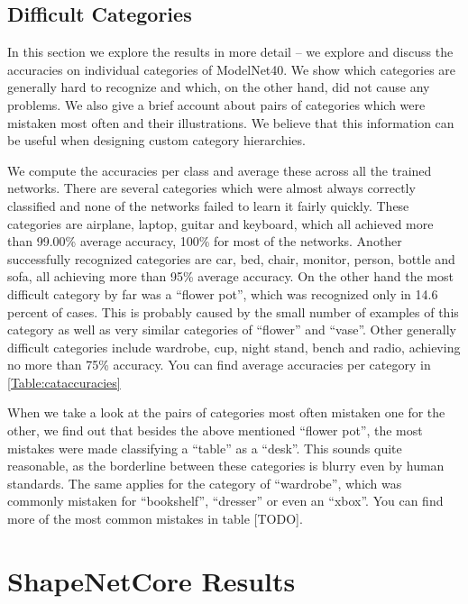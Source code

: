 \subsection{Difficult Categories}
In this section we explore the results in more detail -- we explore and discuss the accuracies on individual categories of ModelNet40. We show which categories are generally hard to recognize and which, on the other hand, did not cause any problems. We also give a brief account about pairs of categories which were mistaken most often and their illustrations. We believe that this information can be useful when designing custom category hierarchies. \par
We compute the accuracies per class and average these across all the trained networks. There are several categories which were almost always correctly classified and none of the networks failed to learn it fairly quickly. These categories are airplane, laptop, guitar and keyboard, which all achieved more than 99.00\% average accuracy, 100\% for most of the networks. Another successfully recognized categories are car, bed, chair, monitor, person, bottle and sofa, all achieving more than 95\% average accuracy.  
On the other hand the most difficult category by far was a “flower pot”, which was recognized only in 14.6 percent of cases. This is probably caused by the small number of examples of this category as well as very similar categories of “flower” and “vase”. Other generally difficult categories include wardrobe, cup, night stand, bench and radio, achieving no more than 75\% accuracy. You can find average accuracies per category in \autoref{Table:cataccuracies} \par
When we take a look at the pairs of categories most often mistaken one for the other, we find out that besides the above mentioned “flower pot”, the most mistakes were made classifying a “table” as a “desk”. This sounds quite reasonable, as the borderline between these categories is blurry even by human standards. The same applies for the category of “wardrobe”, which was commonly mistaken for “bookshelf”, “dresser” or even an “xbox”. You can find more of the most common mistakes in table [TODO].




\section{ShapeNetCore Results}